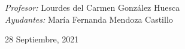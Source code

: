 \begin{center}
\begin{minipage}{0.46\textwidth}
        \begin{flushright} \large						\small										
            \emph{Profesor:} 
            Lourdes del Carmen González Huesca  \\
           \emph{Ayudantes:} 
           María Fernanda Mendoza Castillo \\
        \end{flushright}																	
    \end{minipage}	
    \vspace*{1cm}
    \vspace{2cm}
    \begin{center}						
        {\large 28 Septiembre, 2021}
    \end{center}  						
\end{center}	
\textbf{}